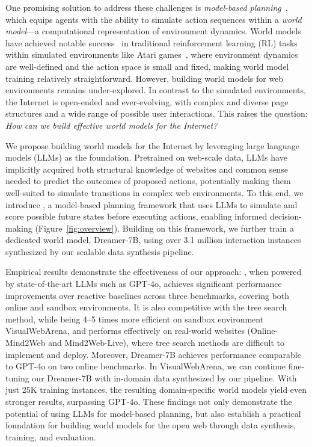 One promising solution to address these challenges is \textit{model-based planning}~\citep{pascanu2017learning, moerland2023model}, which equips agents with the ability to simulate action sequences within a \textit{world model}---a computational representation of environment dynamics.
World models have achieved notable success~\citep{ha2018world, Hafner2020Dreamv1, hafner2021dreamerv2} in traditional reinforcement learning (RL) tasks within simulated environments like Atari games~\citep{Bellemare2013Atari, brockman2016openaigym}, where environment dynamics are well-defined and the action space is small and fixed, making world model training relatively straightforward.
However, building world models for web environments remains under-explored.
In contrast to the simulated environments, the Internet is open-ended and ever-evolving, with complex and diverse page structures and a wide range of possible user interactions.
This raises the question: \textit{How can we build effective world models for the Internet?}

We propose building world models for the Internet by leveraging large language models (LLMs) as the foundation.
Pretrained on web-scale data, LLMs have implicitly acquired both structural knowledge of websites and common sense needed to predict the outcomes of proposed actions, potentially making them well-suited to simulate transitions in complex web environments.
To this end, we introduce \OurMethod, a model-based planning framework that uses LLMs to simulate and score possible future states before executing actions, enabling informed decision-making (Figure~\ref{fig:overview}).
Building on this framework, we further train a dedicated world model, Dreamer-7B, using over 3.1 million interaction instances synthesized by our scalable data synthesis pipeline.

Empirical results demonstrate the effectiveness of our approach:
\OurMethod, when powered by state-of-the-art LLMs such as GPT-4o, achieves significant performance improvements over reactive baselines across three benchmarks, covering both online and sandbox environments.
It is also competitive with the tree search method, while being 4–5 times more efficient on sandbox environment VisualWebArena, and performs effectively on real-world websites (Online-Mind2Web and Mind2Web-Live), where tree search methods are difficult to implement and deploy.
Moreover, Dreamer-7B achieves performance comparable to GPT-4o on two online benchmarks.
In VisualWebArena, we can continue fine-tuning our Dreamer-7B with in-domain data synthesized by our pipeline.
With just 25K training instances, the resulting domain-specific world models yield even stronger results, surpassing GPT-4o.
These findings not only demonstrate the potential of using LLMs for model-based planning, but also establish a practical foundation for building world models for the open web through data synthesis, training, and evaluation.
